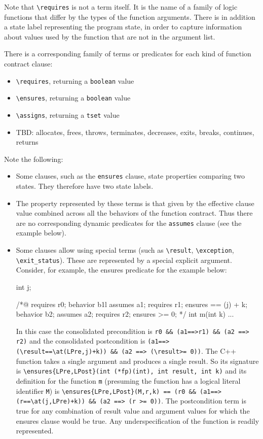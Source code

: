 {Note that \lstinline|\requires| is not a term itself. It is the name of a family of logic functions that differ by the types of the function arguments. There is in addition a state label representing the program state, in order to capture
information about values used by the function that are not in
the argument list. 

There is a corresponding family of terms or predicates for each kind of function contract clause:
\begin{itemize}[noitemsep,nolistsep]
	\item \lstinline|\requires|, returning a \lstinline|boolean| value
	\item \lstinline|\ensures|, returning a \lstinline|boolean| value
	\item\lstinline|\assigns|, returning a \lstinline|tset| value
	\item TBD: allocates, frees, throws, terminates, decreases, exits, breaks, continues, returns
\end{itemize}

Note the following:
\begin{itemize}
	\item Some clauses, such as the \lstinline|ensures| clause,
	state properties comparing two states. They therefore have two state labels.
	\item The property represented by these terms is that
	given by the effective clause value combined across all the
	behaviors of the function contract. Thus there are no
	corresponding dynamic predicates for the \lstinline|assumes| clause (see the example below).
	\item Some clauses allow using special terms (such as 
	\lstinline|\result|, 
	\lstinline|\exception|, \lstinline|\exit_status|). 
	These are represented by a special explicit argument. Consider, for example, the ensures predicate for the example below:
\begin{listing-nonumber}
int j;
		
/*@
requires r0;
behavior b1l
  assumes a1;
  requires r1;
  ensures \result == \old(j) + k;
behavior b2;
  assumes a2;
  requires r2;
  ensures \result >= 0;
*/
int m(int k) { ... }
\end{listing-nonumber}

	In this case the consolidated precondition is
	\lstinline|r0 && (a1==>r1) && (a2 ==> r2)|
	and the consolidated postcondition is 
	\lstinline|(a1==>(\result==\at(LPre,j)+k)) && (a2 ==> (\result>= 0))|.
	The C++ function takes a single argument and produces a single result. So its signature is
	\lstinline|\ensures{LPre,LPost}(int (*fp)(int), int result, int k)|	
	and its definition for the function \lstinline|m| (presuming the function has a logical literal identifier \lstinline|M|) is
	\lstinline|\ensures{LPre,LPost}(M,r,k) == (r0 && (a1==>(r==\at(j,LPre)+k)) && (a2 ==> (r >= 0))|.
	The postcondition term is true for any combination of 
	result value and argument values for which the ensures clause would be true. Any underspecification of the function is readily represented.


\end{itemize}}
